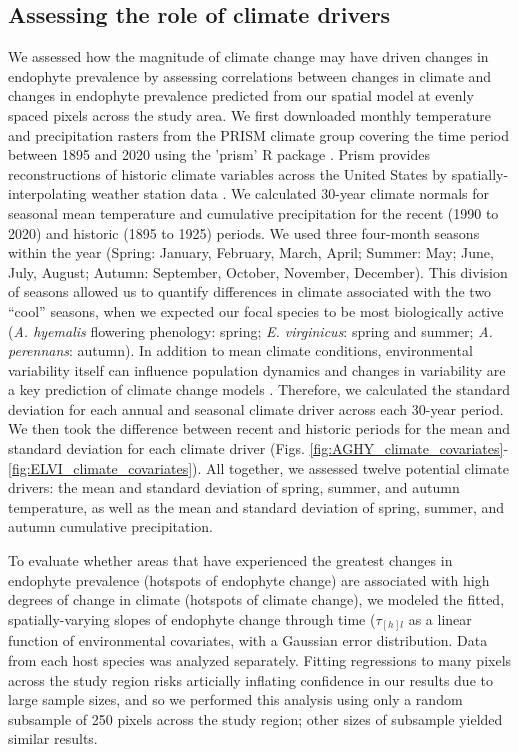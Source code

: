 \documentclass[11pt]{article}
\let\cite\citep
\begin{document}
\subsection*{Assessing the role of climate drivers}
We assessed how the magnitude of climate change may have driven changes in endophyte prevalence by assessing correlations between changes in climate and changes in endophyte prevalence predicted from our spatial model at evenly spaced pixels across the study area.
We first downloaded monthly temperature and precipitation rasters from the PRISM climate group \citep{daly2013prism} covering the time period between 1895 and 2020 using the 'prism' R package \citep{Rprism2015}. 
Prism provides reconstructions of historic climate variables across the United States by spatially-interpolating weather station data \citep{diLuzio2008constructing}. 
We calculated 30-year climate normals for seasonal mean temperature and cumulative precipitation for the recent (1990 to 2020) and historic (1895 to 1925) periods.
We used three four-month seasons within the year (Spring: January, February, March, April; Summer: May; June, July, August; Autumn: September, October, November, December). 
This division of seasons allowed us to quantify differences in climate associated with the two ``cool'' seasons, when we expected our focal species to be most biologically active (\emph{A. hyemalis} flowering phenology: spring; \emph{E. virginicus}: spring and summer; \emph{A. perennans}: autumn). 
In addition to mean climate conditions, environmental variability itself can influence population dynamics \cite{tuljapurkar_population_1982} and changes in variability are a key prediction of climate change models \cite{stocker2013technical, ipcc_2021}. 
Therefore, we calculated the standard deviation for each annual and seasonal climate driver across each 30-year period.
We then took the difference between recent and historic periods for the mean and standard deviation for each climate driver (Figs. \ref{fig:AGHY_climate_covariates}-\ref{fig:ELVI_climate_covariates}).
All together, we assessed twelve potential climate drivers: the mean and standard deviation of spring, summer, and autumn temperature, as well as the mean and standard deviation of spring, summer, and autumn cumulative precipitation.

To evaluate whether areas that have experienced the greatest changes in endophyte prevalence (hotspots of endophyte change) are associated with high degrees of change in climate (hotspots of climate change), we modeled the fitted, spatially-varying slopes of endophyte change through time ($\tau_{[h]l}$ as a linear function of environmental covariates, with a Gaussian error distribution.
Data from each host species was analyzed separately. 
Fitting regressions to many pixels across the study region risks articially inflating confidence in our results due to large sample sizes, and so we performed this analysis using only a random subsample of 250 pixels across the study region; other sizes of subsample yielded similar results.
\end{document}
